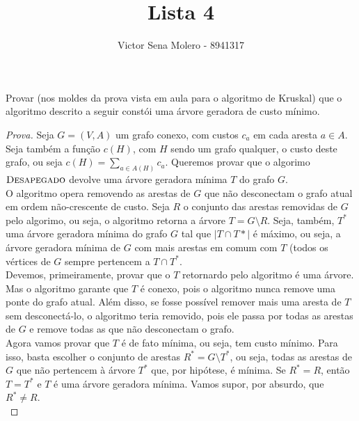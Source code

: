 \documentclass[12pt]{article}
\newenvironment{problem}[2][Ex]{\begin{trivlist}
\item[\hskip \labelsep {\bfseries #1}\hskip \labelsep {\bfseries #2.}]}{\end{trivlist}}
\begin{document}
 
 
\title{Lista 4}
\author{Victor Sena Molero - 8941317}
\maketitle

\begin{problem}{16}
Provar (nos moldes da prova vista em aula para o algoritmo de Kruskal) que o algoritmo descrito a seguir constói uma árvore geradora de custo mínimo.
\end{problem}

\begin{proof}[Prova]
Seja $G = (V, A)$ um grafo conexo, com custos $c_a$ em cada aresta $a \in A$. Seja também a função $c(H)$, com $H$ sendo um grafo qualquer, o custo deste grafo, ou seja $c(H) = \sum_{a \in A(H)} c_a$. Queremos provar que o algorimo $\textsc{Desapegado}$ devolve uma árvore geradora mínima $T$ do grafo $G$. \\
O algoritmo opera removendo as arestas de $G$ que não desconectam o grafo atual em ordem não-crescente de custo. Seja $R$ o conjunto das arestas removidas de $G$ pelo algorimo, ou seja, o algoritmo retorna a árvore $T = G \setminus R$. Seja, também, $T^*$ uma árvore geradora mínima do grafo $G$ tal que $|T \cap T*|$ é máximo, ou seja, a árvore geradora mínima de $G$ com mais arestas em comum com $T$ (todos os vértices de $G$ sempre pertencem a $T \cap T^*$. \\
Devemos, primeiramente, provar que o $T$ retornardo pelo algoritmo é uma árvore. Mas o algoritmo garante que $T$ é conexo, pois o algoritmo nunca remove uma ponte do grafo atual. Além disso, se fosse possível remover mais uma aresta de $T$ sem desconectá-lo, o algoritmo teria removido, pois ele passa por todas as arestas de $G$ e remove todas as que não desconectam o grafo. \\
Agora vamos provar que $T$ é de fato mínima, ou seja, tem custo mínimo. Para isso, basta escolher o conjunto de arestas $R^* = G \setminus T^*$, ou seja, todas as arestas de $G$ que não pertencem à árvore $T^*$ que, por hipótese, é mínima. Se $R^* = R$, então $T = T^*$ e $T$ é uma árvore geradora mínima. Vamos supor, por absurdo, que $R^* \neq R$. \\

\end{proof}
\end{document}
